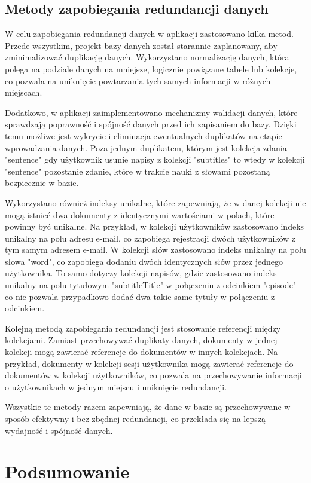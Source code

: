 \subsection{Metody zapobiegania redundancji danych}
W celu zapobiegania redundancji danych w aplikacji zastosowano kilka metod. Przede wszystkim, projekt bazy danych został starannie zaplanowany, aby zminimalizować duplikację danych. Wykorzystano normalizację danych, która polega na podziale danych na mniejsze, logicznie powiązane tabele lub kolekcje, co pozwala na uniknięcie powtarzania tych samych informacji w różnych miejscach.

Dodatkowo, w aplikacji zaimplementowano mechanizmy walidacji danych, które sprawdzają poprawność i spójność danych przed ich zapisaniem do bazy. Dzięki temu możliwe jest wykrycie i eliminacja ewentualnych duplikatów na etapie wprowadzania danych. Poza jednym duplikatem, którym jest kolekcja zdania "sentence" gdy użytkownik usunie napisy z kolekcji "subtitles" to wtedy w kolekcji "sentence" pozostanie zdanie, które w trakcie nauki z słowami pozostaną bezpiecznie w bazie.

Wykorzystano również indeksy unikalne, które zapewniają, że w danej kolekcji nie mogą istnieć dwa dokumenty z identycznymi wartościami w polach, które powinny być unikalne. Na przykład, w kolekcji użytkowników zastosowano indeks unikalny na polu adresu e-mail, co zapobiega rejestracji dwóch użytkowników z tym samym adresem e-mail. W kolekcji słów zastosowano indeks unikalny na polu słowa "word", co zapobiega dodaniu dwóch  identycznych słów przez jednego użytkownika. To samo dotyczy kolekcji napisów, gdzie zastosowano indeks unikalny na polu tytułowym "subtitleTitle" w połączeniu z odcinkiem "episode" co nie pozwala przypadkowo dodać dwa takie same tytuły w połączeniu z odcinkiem.

Kolejną metodą zapobiegania redundancji jest stosowanie referencji między kolekcjami. Zamiast przechowywać duplikaty danych, dokumenty w jednej kolekcji mogą zawierać referencje do dokumentów w innych kolekcjach. Na przykład, dokumenty w kolekcji sesji użytkownika mogą zawierać referencje do dokumentów w kolekcji użytkowników, co pozwala na przechowywanie informacji o użytkownikach w jednym miejscu i uniknięcie redundancji.

Wszystkie te metody razem zapewniają, że dane w bazie są przechowywane w sposób efektywny i bez zbędnej redundancji, co przekłada się na lepszą wydajność i spójność danych.




\section{Podsumowanie}
